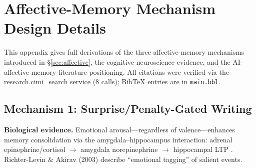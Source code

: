 \section{Affective-Memory Mechanism Design Details}
\label{sec:affective-appendix}

This appendix gives full derivations of the three affective-memory mechanisms introduced in \S\ref{sec:affective}, the cognitive-neuroscience evidence, and the AI-affective-memory literature positioning. All citations were verified via the research.cimi\_search service (8 calls); BibTeX entries are in \texttt{main.bbl}.

\subsection{Mechanism 1: Surprise/Penalty-Gated Writing}

{\sloppy \textbf{Biological evidence.} Emotional arousal---regardless of valence---enhances memory consolidation via the amygdala--hippocampus interaction: adrenal epinephrine/cortisol $\rightarrow$ amygdala norepinephrine $\rightarrow$ hippocampal LTP \cite{mcgaugh2004}. Richter-Levin \& Akirav (2003) describe ``emotional tagging'' of salient events.\par}

